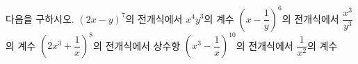 다음을 구하시오.
 $(2x-y)^7$의 전개식에서 $x^4y^3$의 계수
 $\left(x-\dfrac{1}{y}\right)^6$의 전개식에서 $\dfrac{x^3}{y^3}$의 계수
 $\left(2x^3+\dfrac{1}{x}\right)^8$의 전개식에서 상수항
 $\left(x^3-\dfrac{1}{x}\right)^{10}$의 전개식에서 $\dfrac{1}{x^2}$의 계수
